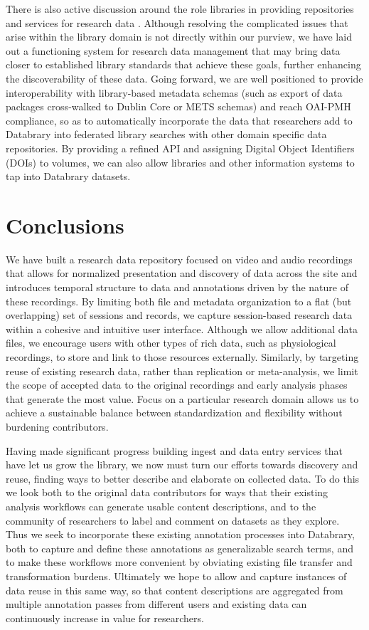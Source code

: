 \documentclass{sig-alternate}
\begin{document}
There is also active discussion around the role libraries in providing repositories and services for research data \cite{Castelli_etal_2013,Nielson_Hjørland_2014,Macmillan_2014,Pinfield_etal_2014}.
Although resolving the complicated issues that arise within the library domain is not directly within our purview, we have laid out a functioning system for research data management that may bring data closer to established library standards that achieve these goals, further enhancing the discoverability of these data.
Going forward, we are well positioned to provide interoperability with library-based metadata schemas (such as export of data packages cross-walked to Dublin Core or METS schemas) and reach OAI-PMH compliance, so as to automatically incorporate the data that researchers add to Databrary into federated library searches with other domain specific data repositories.
By providing a refined API and assigning Digital Object Identifiers (DOIs) to volumes, we can also allow libraries and other information systems to tap into Databrary datasets.

\section{Conclusions}

We have built a research data repository focused on video and audio recordings that allows for normalized presentation and discovery of data across the site and introduces temporal structure to data and annotations driven by the nature of these recordings.
By limiting both file and metadata organization to a flat (but overlapping) set of sessions and records, we capture session-based research data within a cohesive and intuitive user interface.
Although we allow additional data files, we encourage users with other types of rich data, such as physiological recordings, to store and link to those resources externally.
Similarly, by targeting reuse of existing research data, rather than replication or meta-analysis, we limit the scope of accepted data to the original recordings and early analysis phases that generate the most value.
Focus on a particular research domain allows us to achieve a sustainable balance between standardization and flexibility without burdening contributors.

Having made significant progress building ingest and data entry services that have let us grow the library, we now must turn our efforts towards discovery and reuse, finding ways to better describe and elaborate on collected data.
To do this we look both to the original data contributors for ways that their existing analysis workflows can generate usable content descriptions, and to the community of researchers to label and comment on datasets as they explore.
Thus we seek to incorporate these existing annotation processes into Databrary, both to capture and define these annotations as generalizable search terms, and to make these workflows more convenient by obviating existing file transfer and transformation burdens.
Ultimately we hope to allow and capture instances of data reuse in this same way, so that content descriptions are aggregated from multiple annotation passes from different users and existing data can continuously increase in value for researchers.
\end{document}
